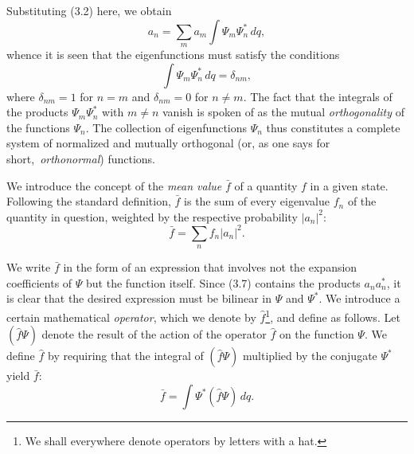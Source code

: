 Substituting (3.2) here, we obtain
\[
  a_n = \sum_m a_m\int \Psi_m\Psi_n^*\,dq,
\]
whence it is seen that the eigenfunctions must satisfy the conditions
\begin{equation}
  \int \Psi_m\Psi_n^*\,dq = \delta_{nm},
  \tag{3.6}
\end{equation}
where $\delta_{nm}=1$ for $n=m$ and $\delta_{nm}=0$ for $n\ne m$. The fact that
the integrals of the products $\Psi_m\Psi_n^*$ with $m\ne n$ vanish is spoken of
as the mutual \emph{orthogonality} of the functions $\Psi_n$. The collection of
eigenfunctions $\Psi_n$ thus constitutes a complete system of normalized and mutually
orthogonal (or, as one says for short,~\emph{orthonormal}) functions.

We introduce the concept of the \emph{mean value} $\bar f$ of a quantity $f$ in
a given state. Following the standard definition,
$\bar f$ is the sum of every eigenvalue $f_n$ of the quantity in question, weighted by the respective%
probability $|a_n|^2$:
\begin{equation}
  \bar f = \sum_n f_n|a_n|^2.
  \tag{3.7}
\end{equation}

We write $\bar f$ in the form of an expression that involves not the expansion
coefficients of $\Psi$ but the function itself. Since (3.7) contains the
products $a_n a_n^*$, it is clear that the desired expression must be bilinear
in $\Psi$ and $\Psi^*$. We introduce a certain mathematical \emph{operator},
which we denote by $\hat f$\footnote{We shall everywhere denote operators by
letters with a hat.}, and define as follows. Let $(\hat f\Psi)$ denote the
result of the action of the operator $\hat f$ on the function $\Psi$. We define
$\hat f$ by requiring that the integral of $(\hat f\Psi)$ multiplied by the
conjugate $\Psi^*$ yield $\bar f$:
\begin{equation}
  \bar f = \int \Psi^*(\hat f\Psi)\,dq.
  \tag{3.8}
\end{equation}

